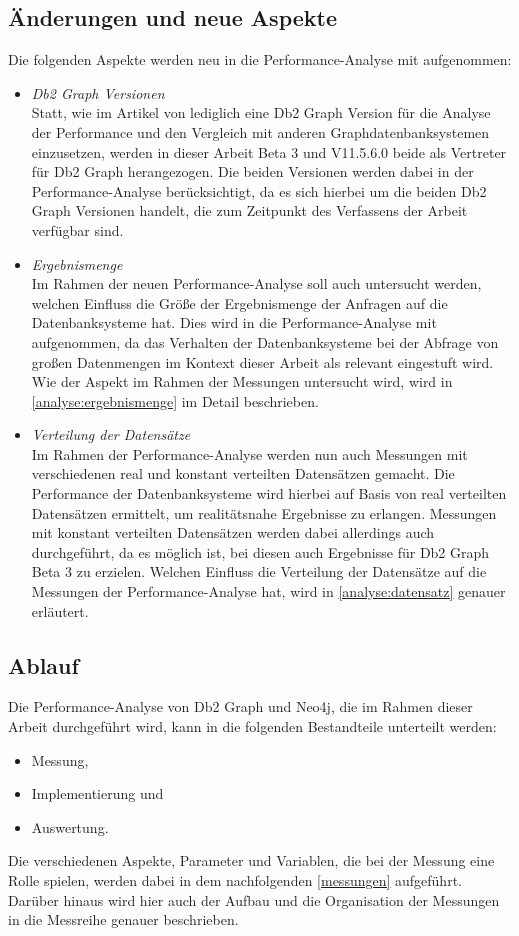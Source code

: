 \subsection{Änderungen und neue Aspekte}
Die folgenden Aspekte werden neu in die Performance-Analyse mit aufgenommen:
\begin{itemize}
    \item \textit{Db2 Graph Versionen}\\
    Statt, wie im Artikel von  lediglich eine Db2 Graph Version für die Analyse der Performance und den Vergleich mit anderen Graphdatenbanksystemen einzusetzen, werden in dieser Arbeit Beta 3 und V11.5.6.0 beide als Vertreter für Db2 Graph herangezogen. Die beiden Versionen werden dabei in der Performance-Analyse berücksichtigt, da es sich hierbei um die beiden Db2 Graph Versionen handelt, die zum Zeitpunkt des Verfassens der Arbeit verfügbar sind.
    \item \textit{Ergebnismenge}\\
    Im Rahmen der neuen Performance-Analyse soll auch untersucht werden, welchen Einfluss die Größe der Ergebnismenge der Anfragen auf die Datenbanksysteme hat. Dies wird in die Performance-Analyse mit aufgenommen, da das Verhalten der Datenbanksysteme bei der Abfrage von großen Datenmengen im Kontext dieser Arbeit als relevant eingestuft wird. Wie der Aspekt im Rahmen der Messungen untersucht wird, wird in \autoref{analyse:ergebnismenge} im Detail beschrieben.
    \item \textit{Verteilung der Datensätze}\\
    Im Rahmen der Performance-Analyse werden nun auch Messungen mit verschiedenen real und konstant verteilten Datensätzen gemacht. Die Performance der Datenbanksysteme wird hierbei auf Basis von real verteilten Datensätzen ermittelt, um realitätsnahe Ergebnisse zu erlangen. Messungen mit konstant verteilten Datensätzen werden dabei allerdings auch durchgeführt, da es möglich ist, bei diesen auch Ergebnisse für Db2 Graph Beta 3 zu erzielen. Welchen Einfluss die Verteilung der Datensätze auf die Messungen der Performance-Analyse hat, wird in \autoref{analyse:datensatz} genauer erläutert. 
\end{itemize}

\subsection{Ablauf}
Die Performance-Analyse von Db2 Graph und Neo4j, die im Rahmen dieser Arbeit durchgeführt wird, kann in die folgenden Bestandteile unterteilt werden: 
\begin{itemize}
    \item Messung,
    \item Implementierung und 
    \item Auswertung.
\end{itemize}
Die verschiedenen Aspekte, Parameter und Variablen, die bei der Messung eine Rolle spielen, werden dabei in dem nachfolgenden \autoref{messungen} aufgeführt. Darüber hinaus wird hier auch der Aufbau und die Organisation der Messungen in die Messreihe genauer beschrieben. 

